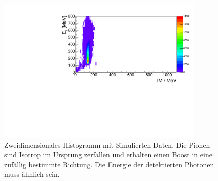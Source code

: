 \documentclass[a4paper,11pt,oneside,final,german,openbib,pdftex]{scrbook}
\begin{document}
{\begin{appendix}

\begin{figure}[h!]
	\begin{center}
		\includegraphics[width=100mm]{NewCalib/UrsprungIsotrop/20171904SimUrsprungIsotropNoCutHist}
		\caption[Simulation: 2D-Hist Isotroper Boost im Ursprung ]{Zweidimensionales Histogramm mit Simulierten Daten. Die Pionen sind Isotrop im Ursprung zerfallen und erhalten einen Boost in eine zuf\"allig bestimmte Richtung. Die Energie der detektierten Photonen muss \"ahnlich sein.}
		\label{fig:Sim-Data-Ursprung-2DHist-No-Cut}
	\end{center}
\end{figure}

\end{appendix}}
\end{document}
